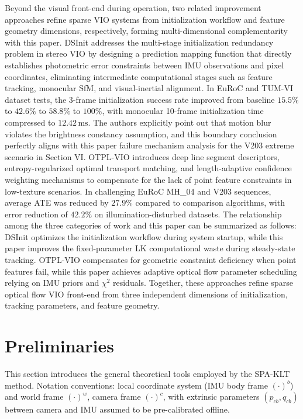 \documentclass[journal,twoside,web]{ieeecolor}
\begin{document}
Beyond the visual front-end during operation, two related improvement approaches refine sparse VIO systems from initialization workflow and feature geometry dimensions, respectively, forming multi-dimensional complementarity with this paper. DSInit \cite{qiu2026dsinit} addresses the multi-stage initialization redundancy problem in stereo VIO by designing a prediction mapping function that directly establishes photometric error constraints between IMU observations and pixel coordinates, eliminating intermediate computational stages such as feature tracking, monocular SfM, and visual-inertial alignment. In EuRoC and TUM-VI dataset tests, the 3-frame initialization success rate improved from baseline $15.5\%$ to $42.6\%$ to $58.8\%$ to $100\%$, with monocular 10-frame initialization time compressed to $12.42\,\mathrm{ms}$. The authors explicitly point out that motion blur violates the brightness constancy assumption, and this boundary conclusion perfectly aligns with this paper failure mechanism analysis for the V203 extreme scenario in Section VI. OTPL-VIO \cite{chen2026otpl} introduces deep line segment descriptors, entropy-regularized optimal transport matching, and length-adaptive confidence weighting mechanisms to compensate for the lack of point feature constraints in low-texture scenarios. In challenging EuRoC MH\_04 and V203 sequences, average ATE was reduced by $27.9\%$ compared to comparison algorithms, with error reduction of $42.2\%$ on illumination-disturbed datasets. The relationship among the three categories of work and this paper can be summarized as follows: DSInit optimizes the initialization workflow during system startup, while this paper improves the fixed-parameter LK computational waste during steady-state tracking. OTPL-VIO compensates for geometric constraint deficiency when point features fail, while this paper achieves adaptive optical flow parameter scheduling relying on IMU priors and $\chi^{2}$ residuals. Together, these approaches refine sparse optical flow VIO front-end from three independent dimensions of initialization, tracking parameters, and feature geometry.

\section{Preliminaries}

This section introduces the general theoretical tools employed by the SPA-KLT method. Notation conventions: local coordinate system (IMU body frame $(\cdot)^{b}$) and world frame $(\cdot)^{w}$, camera frame $(\cdot)^{c}$, with extrinsic parameters $(p_{cb}, q_{cb})$ between camera and IMU assumed to be pre-calibrated offline.
\end{document}
